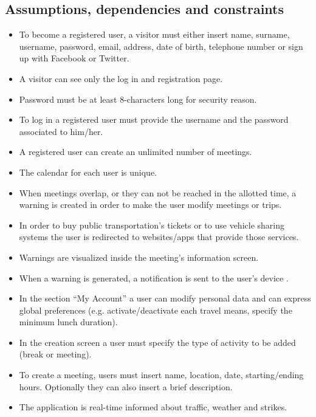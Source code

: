 \documentclass[12pt,titlepage]{article}
\begin{document}
\subsection{Assumptions, dependencies and constraints}\label{sec:mod1}
\begin{itemize}
\item To become a registered user, a visitor must either insert name, surname, username, password, email, address, date of birth, telephone number or sign up with Facebook or Twitter.
\item A visitor can see only the log in and registration page.
\item Password must be at least 8-characters long for security reason.
\item To log in a registered user must provide the username and the password associated to him/her.
\item A registered user can create an unlimited number of meetings.
\item The calendar for each user is unique.
\item When meetings overlap, or they can not be reached in the allotted time, a warning is created in order to make the user modify meetings or trips.
\item In order to buy public transportation's tickets or to use vehicle sharing systems the user is redirected to websites/apps that provide those services.
\item Warnings are visualized inside the meeting's information screen.
\item When a warning is generated, a notification is sent to the user's device .
\item In the section ``My Account'' a user can modify personal data and can express global preferences (e.g. activate/deactivate each travel means, specify the minimum lunch duration).
\item In the creation screen a user must specify the type of activity to be added (break or meeting).
\item To create a meeting, users must insert name, location, date, starting/ending hours. Optionally they can also insert a brief description.
\item The application is real-time informed about traffic, weather and strikes.
\end{itemize}
\end{document}
